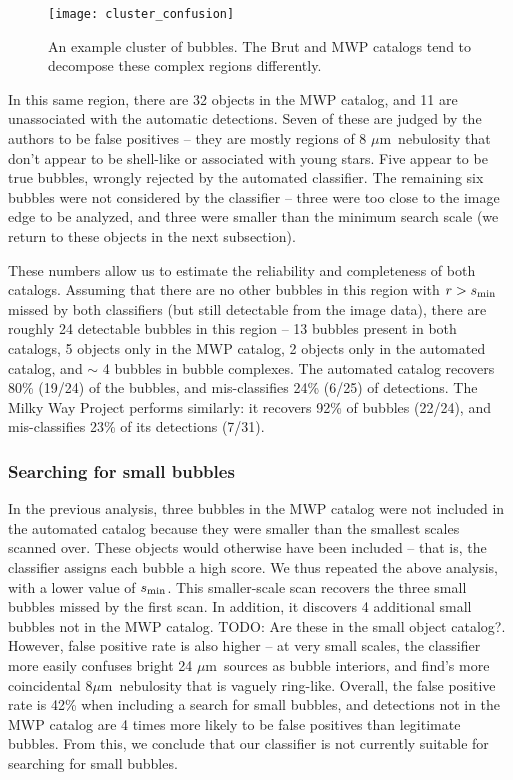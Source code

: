 \documentclass[preprint]{aastex}
\newcommand{\todo}[1]{{\color[rgb]{0, .5, .5} TODO: #1}}
\newcommand{\um}[0]{$\mu$m}
\begin{document}
\begin{figure}
\texttt{[image: cluster\_confusion]}
\caption{An example cluster of bubbles. The Brut and MWP catalogs tend to decompose these complex regions differently.}
\label{fig:cluster_confusion}
\end{figure}
 
In this same region, there are 32 objects in the MWP catalog, and 11 are unassociated with the automatic detections. Seven of these are judged by the authors to be false positives -- they are mostly regions of 8 \um\, nebulosity that don't appear to be shell-like or associated with young stars.  Five appear to be true bubbles, wrongly rejected by the automated classifier. The remaining six bubbles were not considered by the classifier -- three were too close to the image edge to be analyzed, and three were smaller than the minimum search scale (we return to these objects in the next subsection). 

These numbers allow us to estimate the reliability and completeness of both catalogs. Assuming that there are no other bubbles in this region with $r > s_{\rm min}$ missed by both classifiers (but still detectable from the image data), there are roughly 24 detectable bubbles in this region -- 13 bubbles present in both catalogs, 5 objects only in the MWP catalog, 2 objects only in the automated catalog, and $\sim$ 4 bubbles in bubble complexes. The automated catalog recovers 80\% (19/24) of the bubbles, and mis-classifies 24\% (6/25) of detections. The Milky Way Project performs similarly: it recovers 92\% of bubbles (22/24), and mis-classifies 23\% of its detections (7/31).

\subsubsection{Searching for small bubbles}
In the previous analysis, three bubbles in the MWP catalog were not included in the automated catalog because they were smaller than the smallest scales scanned over.  These objects would otherwise have been included -- that is, the classifier assigns each bubble a high score. We thus repeated the above analysis, with a lower value of $s_{\rm min}$. This smaller-scale scan recovers the three small bubbles missed by the first scan. In addition, it discovers 4 additional small bubbles not in the MWP catalog. \todo{Are these in the small object catalog?}. However, false positive rate is also higher -- at very small scales, the classifier more easily confuses bright 24 \um\, sources as bubble interiors, and find's more coincidental 8\um\, nebulosity that is vaguely ring-like. Overall, the false positive rate is 42\% when including a search for small bubbles, and detections not in the MWP catalog are 4 times more likely to be false positives than legitimate bubbles. From this, we conclude that our classifier is not currently suitable for searching for small bubbles.
\end{document}
